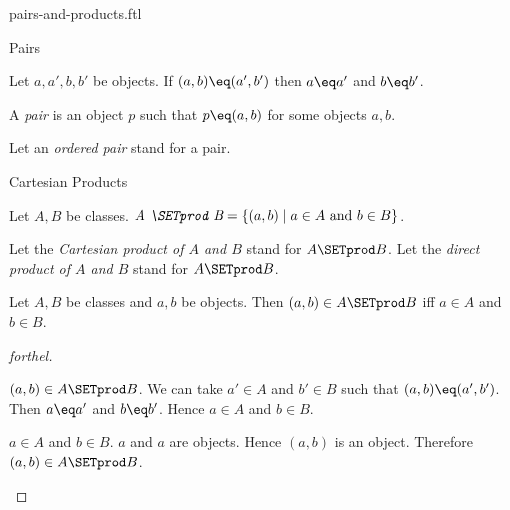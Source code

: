\documentclass{naproche-library}
\begin{document}
\begin{smodule}[title=Ordered Pairs and Cartesian Products]{pairs-and-products.ftl}

\begin{sfragment}{Pairs}
  \begin{axiom}[forthel,id=FOUNDATIONS_04_8464577431863296]
    Let $a, a', b, b'$ be objects.
    If $(a, b) \eq (a', b')$ then $a \eq a'$ and $b \eq b'$.
  \end{axiom}


  \begin{definition}[forthel,id=FOUNDATIONS_04_4782386822774784]
    A \emph{pair} is an object $p$ such that $p \eq (a, b)$ for some objects $a, b$.

    Let an \emph{ordered pair} stand for a pair.
  \end{definition}
\end{sfragment}

\begin{sfragment}{Cartesian Products}
  \begin{definition}[forthel,id=FOUNDATIONS_04_2877806274936832]
    Let $A, B$ be classes.
    $\emph{A \SETprod B} = \{ (a, b) \mid a \in A\text{ and }b \in B \}$.

    Let the \emph{Cartesian product of $A$ and $B$} stand for $A \SETprod B$.
    Let the \emph{direct product of $A$ and $B$} stand for $A \SETprod B$.
  \end{definition}

  \begin{proposition}[forthel,id=FOUNDATIONS_04_1581118511906816]
    Let $A, B$ be classes and $a, b$ be objects.
    Then $(a, b) \in A \SETprod B$ iff $a \in A$ and $b \in B$.
  \end{proposition}
  \begin{proof}[forthel]
    \begin{case}{$(a, b) \in A \SETprod B$.}
      We can take $a' \in A$ and $b' \in B$ such that $(a, b) \eq (a', b')$.
      Then $a \eq a'$ and $b \eq b'$.
      Hence $a \in A$ and $b \in B$.
    \end{case}

    \begin{case}{$a \in A$ and $b \in B$.}
      $a$ and $a$ are objects.
      Hence $(a, b)$ is an object.
      Therefore $(a, b) \in A \SETprod B$.
    \end{case}
  \end{proof}


\end{sfragment}
\end{smodule}
\end{document}
